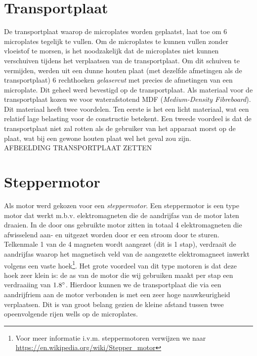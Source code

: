 \documentclass[a4paper,twoside,kulak]{kulakreport} %
\begin{document}
\section{Transportplaat}

De transportplaat waarop de microplates worden geplaatst, laat toe om 6 microplates tegelijk te vullen. Om de microplates te kunnen vullen zonder vloeistof te morsen, is het noodzakelijk dat de microplates niet kunnen verschuiven tijdens het verplaatsen van de transportplaat. Om dit schuiven te vermijden, werden uit een dunne houten plaat (met dezelfde afmetingen als de transportplaat) 6 rechthoeken \textit{gelasercut} met precies de afmetingen van een microplate. Dit geheel werd bevestigd op de transportplaat. Als materiaal voor de transportplaat kozen we voor waterafstotend MDF (\textit{Medium-Density Fibreboard}). Dit materiaal heeft twee voordelen. Ten eerste is het een licht materiaal, wat een relatief lage belasting voor de constructie betekent. Een tweede voordeel is dat de transportplaat niet zal rotten als de gebruiker van het apparaat morst op de plaat, wat bij een gewone houten plaat wel het geval zou zijn.  \\


AFBEELDING TRANSPORTPLAAT ZETTEN



\section{Steppermotor}

Als motor werd gekozen voor een \textit{steppermotor}. Een steppermotor is een type motor dat werkt m.b.v. elektromagneten die de aandrijfas van de motor laten draaien. In de door ons gebruikte motor zitten in totaal 4 elektromagneten die afwisselend aan- en uitgezet worden door er een stroom door te sturen. Telkenmale 1 van de 4 magneten wordt aangezet (dit is 1 stap), verdraait de aandrijfas waarop het magnetisch veld van de aangezette elektromagneet inwerkt volgens een vaste hoek\footnote{Voor meer informatie i.v.m. steppermotoren verwijzen we naar \url{https://en.wikipedia.org/wiki/Stepper_motor}}. Het grote voordeel van dit type motoren is dat deze hoek zeer klein is: de as van de motor die wij gebruiken maakt per stap een verdraaiing van $1.8\degree$. Hierdoor kunnen we de transportplaat die via een aandrijfriem aan de motor verbonden is met een zeer hoge nauwkeurigheid verplaatsen. Dit is van groot belang gezien de kleine afstand tussen twee opeenvolgende rijen wells op de microplates. 
\end{document}
